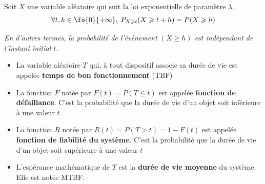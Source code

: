 \begin{propriete}{}

	Soit $X$ une variable aléatoire qui suit la loi exponentielle de paramètre $\lambda$.  \[\forall t,h \in \fo{0}{+\infty}, \; P_{X\geqslant t}(X \geqslant t+h)=P(X\geqslant h)\]
\end{propriete}


\vrule
\hfill
\begin{minipage}{0.98\linewidth}
\it   En d'autres termes, la probabilité de l'évènement $(X \geqslant h)$ est indépendant de l'instant initial $t$.
	
\end{minipage}


 \begin{itemize}
 	\item La variable aléatoire $T$ qui, à tout dispositif associe sa durée de vie est appelée \textbf{temps de bon fonctionnement} (TBF)
 	
 	\smallskip
 	\item La fonction $F$ notée par $F(t)=P(T \leqslant t)$ est appelée \textbf{fonction de défaillance}. C'est la probabilité que la durée de vie d'un objet soit inférieure à une valeur $t$
 	
 	\smallskip
  	\item La fonction $R$ notée par $R(t)=P(T > t)=1-F(t)$ est appelée \textbf{fonction de fiabilité du système}. C'est la probabilité que la durée de vie d'un objet soit supérieure à une valeur $t$
 	
 	\smallskip
  	\item L'espérance mathématique de $T$ est la \textbf{durée de vie moyenne} du système. Elle est notée MTBF.
	
 	
 \end{itemize}

